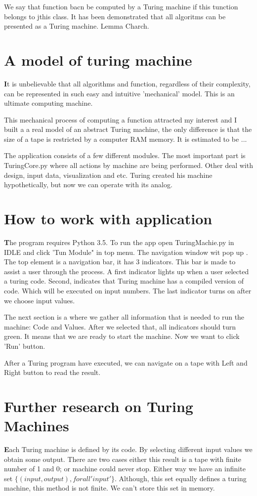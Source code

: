 \documentclass[12pt]{article}
\begin{document}
We say that function bacn be computed by a Turing machine if this tunction belongs to jthis class. It has been demonstrated that all algoritms can be presented as a Turing machine. Lemma Charch.

\section{A model of turing machine}
\textbf{\large I}t is unbelievable that all algorithms and function, regardless of their complexity, can be represented in such easy and intuitive 'mechanical' model. This is an ultimate computing machine.

This mechanical process of computing a function attracted my interest and I built a a real model of an abstract Turing machine, the only difference is that the size of a tape is restricted by a computer RAM memory. It is estimated to be ... 

The application consists of a few different modules. The most important part is TuringCore.py where all actions by machine are being performed. Other deal with design, input data, visualization and etc. Turing created his machine hypothetically, but now we can operate with its analog.

\section{How to work with application}
\textbf{\large T}he program requires Python 3.5. To run the app open TuringMachie.py in IDLE and click 'Tun Module" in top menu. The navigation window wit pop up . The top element is a navigation bar, it has 3 indicators. This bar is made to assist a user through the process. A first indicator lights up when a user selected a turing code. Second, indicates that Turing machine has a compiled version of code. Which will be executed on input numbers. The last indicator turns on after we choose input values.

The next section is a where we gather all information that is needed to run the machine: Code and Values. After we selected that, all indicators should turn green. It means that we are ready to start the machine. Now we want to click 'Run' button.

After a Turing program have executed, we can navigate on a tape with Left and Right button to read the result.

\section{Further research on Turing Machines}
\textbf{\large E}ach Turing machine is defined by its code. By selecting different input values we obtain some output. There are two cases either this result is a tape with finite number of 1 and 0; or machine could never stop. Either way we have an infinite set $\{(input, output), for all 'input'\}$. Although, this set equally defines a turing machine, this method is not finite. We can't store this set in memory.


\end{document}
